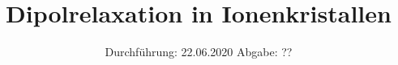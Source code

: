 

\subject{Nr. 48}
\title{Dipolrelaxation in Ionenkristallen}
\date{%
  Durchführung: 22.06.2020
  \hspace{3em}
  Abgabe: ??
}



\maketitle
\thispagestyle{empty}
\tableofcontents
\newpage






\printbibliography{}


